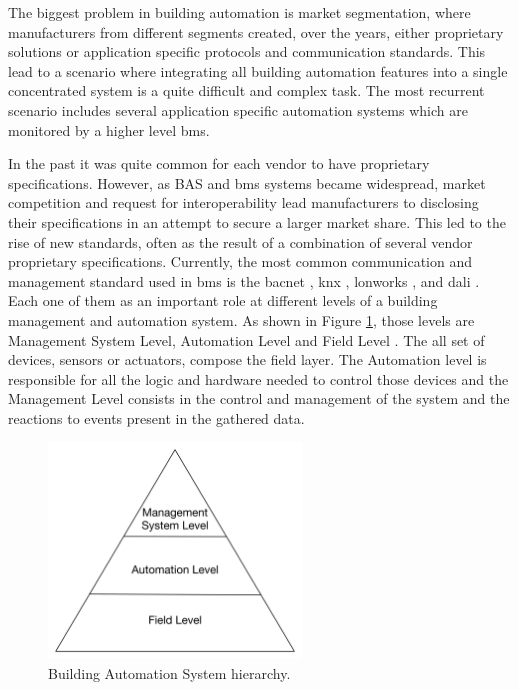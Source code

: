 The biggest problem in building automation is market segmentation, where manufacturers from different segments created, over the years, either proprietary solutions or application specific protocols and communication standards.  This lead to a scenario where integrating all building automation features into a single concentrated system is a quite  difficult and complex task. The most recurrent scenario includes several application specific automation systems which are monitored by a higher level \acf{bms}.

In the past it was quite common for each vendor to have proprietary specifications. However, as BAS and \ac{bms} systems became widespread, market competition and request for interoperability lead manufacturers to disclosing their specifications in an attempt to secure a larger market share. This led to the rise of new standards, often as the result of a combination of several vendor proprietary specifications. Currently, the most common communication and management standard used in \ac{bms} is the \acf{bacnet} \cite{bacnet}, \acf{knx} \cite{knx}, \acf{lonworks} \cite{EchelonCorporation2009}, and \acf{dali} \cite{dali}. Each one of them as an important role at different levels of a building management and automation system. As shown in Figure \ref{fig:hierarchy}, those levels are Management System Level, Automation Level and Field Level \cite{Iwayemi2011}. The all set of devices, sensors or actuators, compose the field layer. The Automation level is responsible for all the logic and hardware needed to control those devices and the Management Level consists in the control and management of the system and the reactions to events present in the gathered data.

\begin{figure}[H]
	\centering
	\includegraphics[width=0.6\textwidth]{figures/hierarchy.png}
	\caption{Building Automation System hierarchy. }
	\label{fig:hierarchy}
\end{figure}

